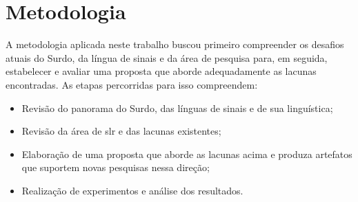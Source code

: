 \section{Metodologia}
\label{sec:introducao-metodologia}

A metodologia aplicada neste trabalho buscou primeiro compreender os desafios atuais do Surdo, da língua de sinais e da área de pesquisa para, em seguida, estabelecer e avaliar uma proposta que aborde adequadamente as lacunas encontradas.
As etapas percorridas para isso compreendem:


\begin{itemize}
    \item Revisão do panorama do Surdo, das línguas de sinais e de sua linguística;
    \item Revisão da área de \acrlong{slr} e das lacunas existentes;
    \item Elaboração de uma proposta que aborde as lacunas acima e produza artefatos que suportem novas pesquisas nessa direção;
    \item Realização de experimentos e análise dos resultados.
\end{itemize}


